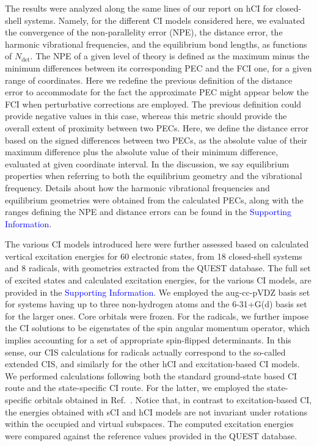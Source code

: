 \documentclass[aip,jcp,reprint,noshowkeys,superscriptaddress]{revtex4-1}
\newcommand{\SupInf}{\textcolor{blue}{Supporting Information}}
\newcommand{\Ndet}{N_\text{det}}
\begin{document}
The results were analyzed along the same lines of our report on hCI for closed-shell systems. \cite{Kossoski_2022}
Namely, for the different CI models considered here, 
we evaluated the convergence of the non-parallelity error (NPE), the distance error, the harmonic vibrational frequencies, and the equilibrium bond lengths, as functions of $\Ndet$.
The NPE of a given level of theory is defined as the maximum minus the minimum differences between its corresponding PEC and the FCI one, for a given range of coordinates.
Here we redefine the previous definition of the distance error \cite{Kossoski_2022} to accommodate for the fact the approximate PEC might appear below the FCI when perturbative corrections are employed.
The previous definition could provide negative values in this case, whereas this metric should provide the overall extent of proximity between two PECs.
Here, we define the distance error based on the signed differences between two PECs, as the absolute value of their maximum difference plus the absolute value of their minimum difference, 
evaluated at given coordinate interval.
In the discussion, we say equilibrium properties when referring to both the equilibrium geometry and the vibrational frequency.
Details about how the harmonic vibrational frequencies and equilibrium geometries were obtained from the calculated PECs,
along with the ranges defining the NPE and distance errors can be found in the \SupInf.

The various CI models introduced here were further assessed based on calculated vertical excitation energies for 60 electronic states,
from 18 closed-shell systems and 8 radicals, with geometries extracted from the QUEST database. \cite{Veril_2021}
The full set of excited states and calculated excitation energies, for the various CI models, are provided in the {\SupInf}.
We employed the aug-cc-pVDZ basis set for systems having up to three non-hydrogen atoms and the 6-31+G(d) basis set for the larger ones.
Core orbitals were frozen.
For the radicals, we further impose the CI solutions to be eigenstates of the spin angular momentum operator, which implies accounting for a set of appropriate spin-flipped determinants.
In this sense, our CIS calculations for radicals actually correspond to the so-called extended CIS, \cite{Maurice_1996} and similarly for the other hCI and excitation-based CI models.
We performed calculations following both the standard ground-state based CI route and the state-specific CI route. \cite{Kossoski_2023}
For the latter, we employed the state-specific orbitals obtained in Ref.~.
Notice that, in contrast to excitation-based CI, the energies obtained with sCI and hCI models are not invariant under rotations within the occupied and virtual subspaces.
The computed excitation energies were compared against the reference values provided in the QUEST database. \cite{Veril_2021}
\end{document}
